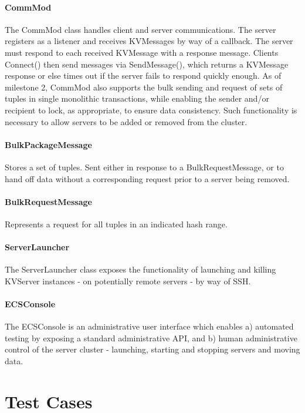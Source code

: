 \documentclass[10pt]{article}
\begin{document}
\begin{multicols}{2}
\paragraph{CommMod} The CommMod class handles client and server communications. The server registers as a listener and receives KVMessages by way of a callback. The server must respond to each received KVMessage with a response message. Clients Connect() then send messages via SendMessage(), which returns a KVMessage response or else times out if the server fails to respond quickly enough. As of milestone 2, CommMod also supports the bulk sending and request of sets of tuples in single monolithic transactions, while enabling the sender and/or recipient to lock, as appropriate, to ensure data consistency. Such functionality is necessary to allow servers to be added or removed from the cluster.

\paragraph{BulkPackageMessage} Stores a set of tuples. Sent either in response to a BulkRequestMessage, or to hand off data without a corresponding request prior to a server being removed.

\paragraph{BulkRequestMessage} Represents a request for all tuples in an indicated hash range.

\paragraph{ServerLauncher} The ServerLauncher class exposes the functionality of launching and killing KVServer instances - on potentially remote servers - by way of SSH.

\paragraph{ECSConsole} The ECSConsole is an administrative user interface which enables a) automated testing by exposing a standard administrative API, and b) human administrative control of the server cluster - launching, starting and stopping servers and moving data.

\section{Test Cases}


\end{multicols}
\end{document}
